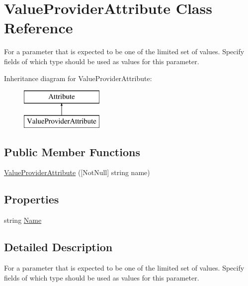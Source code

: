 \hypertarget{class_value_provider_attribute}{}\section{Value\+Provider\+Attribute Class Reference}
\label{class_value_provider_attribute}


For a parameter that is expected to be one of the limited set of values. Specify fields of which type should be used as values for this parameter.  


Inheritance diagram for Value\+Provider\+Attribute\+:\begin{figure}[H]
\begin{center}
\leavevmode
\includegraphics[height=2.000000cm]{class_value_provider_attribute}
\end{center}
\end{figure}
\subsection*{Public Member Functions}
\begin{DoxyCompactItemize}
\item 
\mbox{\hyperlink{class_value_provider_attribute_a767d9340784b59123bd39c4e43b7a08c}{Value\+Provider\+Attribute}} (\mbox{[}Not\+Null\mbox{]} string name)
\end{DoxyCompactItemize}
\subsection*{Properties}
\begin{DoxyCompactItemize}
\item 
string \mbox{\hyperlink{class_value_provider_attribute_a954d0ecb3682e337a4c174d238bdd892}{Name}}
\end{DoxyCompactItemize}


\subsection{Detailed Description}
For a parameter that is expected to be one of the limited set of values. Specify fields of which type should be used as values for this parameter. 



